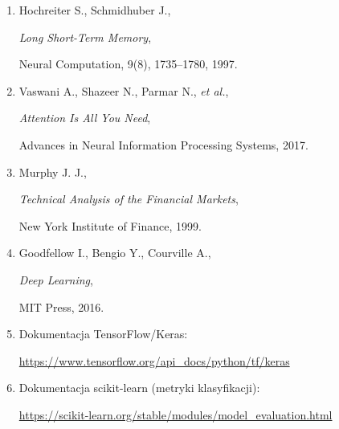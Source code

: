 \documentclass[12pt,a4paper]{report}
\begin{document}
\begin{enumerate}

    \item Hochreiter S., Schmidhuber J.,

          \emph{Long Short-Term Memory},

          Neural Computation, 9(8), 1735--1780, 1997.

    \item Vaswani A., Shazeer N., Parmar N., \emph{et al.},

          \emph{Attention Is All You Need},

          Advances in Neural Information Processing Systems, 2017.

    \item Murphy J. J.,

          \emph{Technical Analysis of the Financial Markets},

          New York Institute of Finance, 1999.

    \item Goodfellow I., Bengio Y., Courville A.,

          \emph{Deep Learning},

          MIT Press, 2016.

    \item Dokumentacja TensorFlow/Keras:

          \url{https://www.tensorflow.org/api_docs/python/tf/keras}

    \item Dokumentacja scikit-learn (metryki klasyfikacji):

          \url{https://scikit-learn.org/stable/modules/model_evaluation.html}

\end{enumerate}
\end{document}

